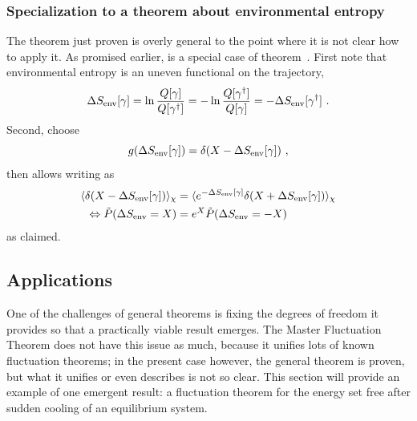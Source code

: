 \subsubsection{Specialization to a theorem about environmental entropy}

The theorem just proven is overly general to the point where it is not clear how to apply it. As promised earlier,  is a special case of theorem~. First note that environmental entropy is an uneven functional on the trajectory,
\begin{equation}
	  \Delta S_\text{env}[\gamma]
	= \ln\frac{Q[\gamma]}{Q[\gamma^\dagger]}
	= -\ln\frac{Q[\gamma^\dagger]}{Q[\gamma]}
	= -\Delta S_\text{env}[\gamma^\dagger] ~.
\end{equation}
%
Second, choose
\begin{equation}
	g(\Delta S_\text{env}[\gamma]) = \delta(X - \Delta S_\text{env}[\gamma]) ~,
\end{equation}
%
then  allows writing  as
%
\begin{align*}
		\langle \delta(X - \Delta S_\text{env}[\gamma])\rangle_\chi
		&=
		\langle e^{-\Delta S_\text{env}[\gamma]}\delta(X + \Delta S_\text{env}[\gamma])\rangle_\chi
	\\ \Leftrightarrow
		\tilde P(\Delta S_\text{env} = X)
		&=
		e^X \tilde P(\Delta S_\text{env} = -X)
\end{align*}
%
as claimed.





\subsection{Applications}
\label{sec:thingie-applications}

One of the challenges of general theorems is fixing the degrees of freedom it provides so that a practically viable result emerges. The Master Fluctuation Theorem \cite{seifert-review} does not have this issue as much, because it unifies lots of known fluctuation theorems; in the present case however, the general theorem is proven, but what it unifies or even describes is not so clear. This section will provide an example of one emergent result: a fluctuation theorem for the energy set free after sudden cooling of an equilibrium system.

